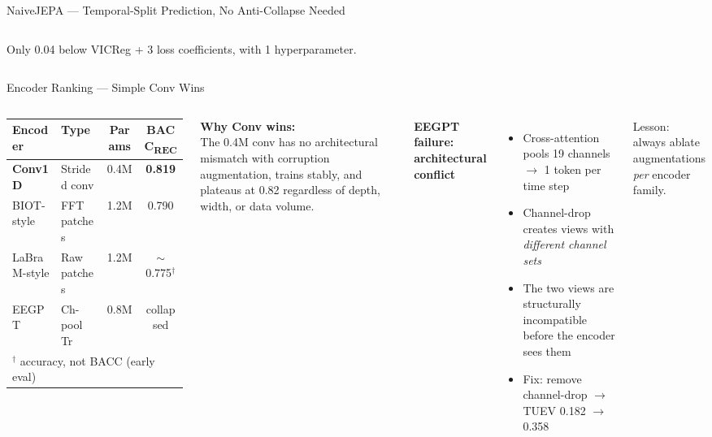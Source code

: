 \documentclass[aspectratio=169,10pt]{beamer}
\begin{document}
\begin{frame}{NaiveJEPA — Temporal-Split Prediction, No Anti-Collapse Needed}
\begin{columns}[T]
\vspace{0.3em}
\textcolor{muted}{\footnotesize Only 0.04 below VICReg + 3 loss coefficients, with 1 hyperparameter.}
\end{columns}
\end{frame}

\begin{frame}{Encoder Ranking — Simple Conv Wins}
\begin{columns}[T]
\begin{tabular}{llcc}
\toprule
Encoder & Type & Params & BACC\textsubscript{REC} \\
\midrule
\textcolor{good}{\textbf{Conv1D}} & Strided conv & 0.4M & \textbf{0.819} \\
BIOT-style & FFT patches & 1.2M & 0.790 \\
LaBraM-style & Raw patches & 1.2M & $\sim$0.775$^\dagger$ \\
\textcolor{warn}{EEGPT} & Ch-pool Tr & 0.8M & \textcolor{warn}{collapsed} \\
\bottomrule
\multicolumn{4}{l}{\footnotesize $^\dagger$ accuracy, not BACC (early eval)}
\end{tabular}

\vspace{0.5em}
\textbf{Why Conv wins:}\\
The 0.4M conv has no architectural mismatch with corruption augmentation, trains stably, and plateaus at 0.82 regardless of depth, width, or data volume.

\textbf{EEGPT failure: architectural conflict}
\begin{itemize}
  \item Cross-attention pools 19 channels $\to$ 1 token per time step
  \item Channel-drop creates views with \emph{different channel sets}
  \item The two views are structurally incompatible before the encoder sees them
  \item Fix: remove channel-drop $\to$ TUEV 0.182 $\to$ 0.358
\end{itemize}

\vspace{0.3em}
\textcolor{muted}{\footnotesize Lesson: always ablate augmentations \emph{per} encoder family.}
\end{columns}
\end{frame}
\end{document}
